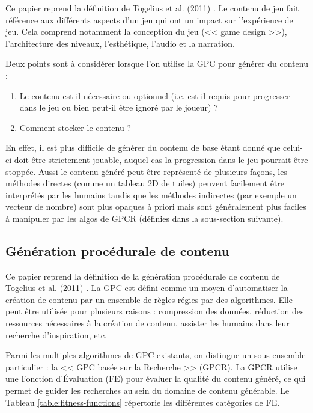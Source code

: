 \documentclass[a4paper,11pt]{article}
\begin{document}
        Ce papier reprend la définition de Togelius et al. (2011) \cite{Togelius}.
        Le contenu de jeu fait référence aux différents aspects d'un jeu qui ont un impact sur l'expérience de jeu.
        Cela comprend notamment la conception du jeu (<< game design >>), l'architecture des niveaux, l'esthétique, l'audio et la narration.
        
        Deux points sont à considérer lorsque l'on utilise la GPC pour générer du contenu :
        \begin{enumerate}
          \item Le contenu est-il nécessaire ou optionnel (i.e. est-il requis pour progresser dans le jeu ou bien peut-il être ignoré par le joueur) ?
          \item Comment stocker le contenu ?
          \vspace{1em}
        \end{enumerate}

        En effet, il est plus difficile de générer du contenu de base étant donné que celui-ci doit être strictement jouable, auquel cas la progression dans le jeu pourrait être stoppée.
        Aussi le contenu généré peut être représenté de plusieurs façons, les méthodes directes (comme un tableau 2D de tuiles) peuvent facilement être interprétés par les humains tandis que les méthodes indirectes (par exemple un vecteur de nombre) sont plus opaques à priori mais sont généralement plus faciles à manipuler par les algos de GPCR (définies dans la sous-section suivante).

      \subsection{Génération procédurale de contenu}\label{section:defs-gpc}

        Ce papier reprend la définition de la génération procédurale de contenu de Togelius et al. (2011) \cite{Togelius}.
        La GPC est défini comme un moyen d'automatiser la création de contenu par un ensemble de règles régies par des algorithmes.
        Elle peut être utilisée pour plusieurs raisons : compression des données, réduction des ressources nécessaires à la création de contenu, assister les humains dans leur recherche d'inspiration, etc.
    
        Parmi les multiples algorithmes de GPC existants, on distingue un sous-ensemble particulier : la << GPC basée sur la Recherche >> (GPCR).
        La GPCR utilise une Fonction d'Évaluation (FE) pour évaluer la qualité du contenu généré, ce qui permet de guider les recherches au sein du domaine de contenu générable.
        Le Tableau \ref{table:fitness-functions} répertorie les différentes catégories de FE.
\end{document}
